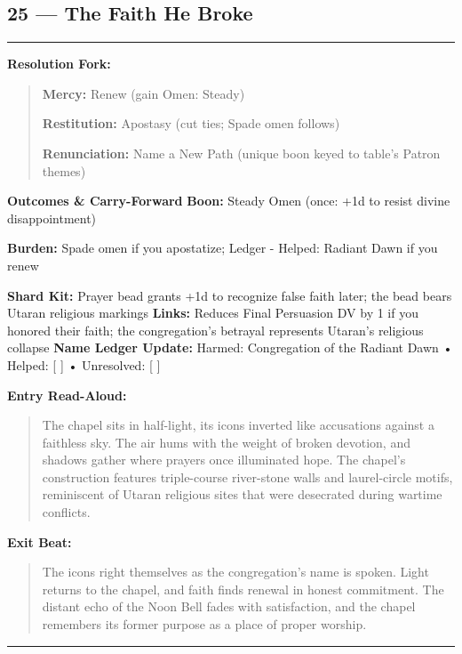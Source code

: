 \documentclass[18pt, letterpaper, twoside]{article}
\newenvironment{floorbox}[1]{%
    \begin{center}
    \begin{minipage}{0.95\textwidth}
    \subsection*{#1}
    \vspace{-0.5em}
    \rule{\textwidth}{0.5pt}
    \vspace{0.5em}
}{%
    \vspace{0.5em}
    \rule{\textwidth}{0.5pt}
    \end{minipage}
    \end{center}
}
\newenvironment{resolutionbox}{%
    \vspace{0.5em}
    \noindent\textbf{Resolution Fork:}
    \begin{quote}
}{%
    \end{quote}
    \vspace{0.5em}
}
\newenvironment{boxedtext}[1]{%
    \vspace{0.5em}
    \noindent\textbf{#1}
    \begin{quote}
}{%
    \end{quote}
    \vspace{0.5em}
}
\newcommand{\boon}[1]{\noindent\textbf{Boon:} #1\par}
\newcommand{\burden}[1]{\noindent\textbf{Burden:} #1\par}
\newcommand{\entrytext}[1]{\begin{boxedtext}{Entry Read-Aloud:} #1 \end{boxedtext}}
\newcommand{\exittext}[1]{\begin{boxedtext}{Exit Beat:} #1 \end{boxedtext}}
\begin{document}
\begin{floorbox}{25 --- The Faith He Broke}
\begin{resolutionbox}
\textbf{Mercy:} Renew (gain Omen: Steady)

\textbf{Restitution:} Apostasy (cut ties; Spade omen follows)

\textbf{Renunciation:} Name a New Path (unique boon keyed to table's Patron themes)
\end{resolutionbox}

\textbf{Outcomes \& Carry-Forward}
\boon{Steady Omen (once: +1d to resist divine disappointment)}
\burden{Spade omen if you apostatize; Ledger - Helped: Radiant Dawn if you renew}
\textbf{Shard Kit:} Prayer bead grants +1d to recognize false faith later; the bead bears Utaran religious markings
\textbf{Links:} Reduces Final Persuasion DV by 1 if you honored their faith; the congregation's betrayal represents Utaran's religious collapse
\textbf{Name Ledger Update:} Harmed: Congregation of the Radiant Dawn • Helped: [ ] • Unresolved: [ ]

\entrytext{The chapel sits in half-light, its icons inverted like accusations against a faithless sky. The air hums with the weight of broken devotion, and shadows gather where prayers once illuminated hope. The chapel's construction features triple-course river-stone walls and laurel-circle motifs, reminiscent of Utaran religious sites that were desecrated during wartime conflicts.}

\exittext{The icons right themselves as the congregation's name is spoken. Light returns to the chapel, and faith finds renewal in honest commitment. The distant echo of the Noon Bell fades with satisfaction, and the chapel remembers its former purpose as a place of proper worship.}
\end{floorbox}
\end{document}
